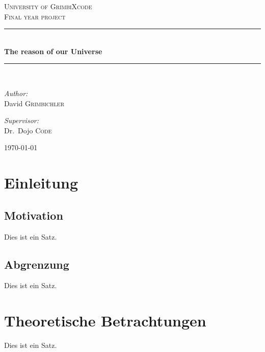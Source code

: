 \documentclass[a4paper, 11pt]{article}
\begin{document}
	\begin{titlepage}

		\begin{center}
			\textsc{\LARGE University of GrimbiXcode}\\[1.5cm]
			\textsc{\Large Final year project}\\[0.5cm]

			\newcommand{\HRule}{\rule{\linewidth}{0.5mm}}
			\HRule \\[0.4cm]
			{ \huge \bfseries The reason of our Universe}\\[0.4cm]
			\HRule \\[1.5cm]
			\begin{minipage}{0.4\textwidth}
				\begin{flushleft} \large
					\emph{Author:}\\
					David \textsc{Grimbichler}
				\end{flushleft}
			\end{minipage}
			\hfill
			\begin{minipage}{0.4\textwidth}
				\begin{flushright} \large
					\emph{Supervisor:} \\
					Dr.~Dojo \textsc{Code}
				\end{flushright}
			\end{minipage}
			\vfill
			{\large \today}

		\end{center}
	\end{titlepage}

\renewcommand{\contentsname}{Inhalt}
\tableofcontents

\newpage

\section{Einleitung}

\subsection{Motivation}

Dies ist ein Satz.

\subsection{Abgrenzung}

Dies ist ein Satz.

\newpage

\section{Theoretische Betrachtungen}

Dies ist ein Satz.

\end{document}
